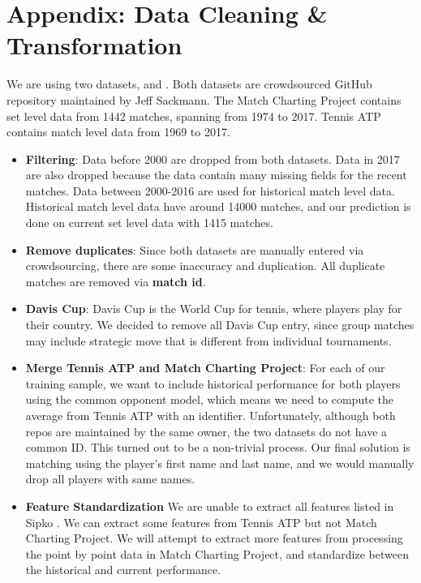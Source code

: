 \documentclass[paper=a4, fontsize=11pt]{scrartcl} %
\numberwithin{equation}{section} %
\numberwithin{figure}{section} %
\numberwithin{table}{section} %
\begin{document}
\section{Appendix: Data Cleaning \& Transformation}
We are using two datasets, \cite{tennis_atp} and \cite{tennis_charting}.  Both datasets are crowdsourced GitHub repository maintained by Jeff Sackmann.  The Match Charting Project contains set level data from 1442 matches, spanning from 1974 to 2017.  Tennis ATP contains match level data from 1969 to 2017.
\begin{itemize}
\item \textbf{Filtering}: Data before 2000 are dropped from both datasets.  Data in 2017 are also dropped because the data contain many missing fields for the recent matches.  Data between 2000-2016 are used for historical match level data.  Historical match level data have around 14000 matches, and our prediction is done on current set level data with 1415 matches.
\item \textbf{Remove duplicates}: Since both datasets are manually entered via crowdsourcing, there are some inaccuracy and duplication.  All duplicate matches are removed via \textbf{match id}.
\item \textbf{Davis Cup}: Davis Cup is the World Cup for tennis, where players play for their country.  We decided to remove all Davis Cup entry, since group matches may include strategic move that is different from individual tournaments.
\item \textbf{Merge Tennis ATP and Match Charting Project}: For each of our training sample, we want to include historical performance for both players using the common opponent model, which means we need to compute the average from Tennis ATP with an identifier.  Unfortunately, although both repos are maintained by the same owner, the two datasets do not have a common ID.  This turned out to be a non-trivial process.  Our final solution is matching using the player's first name and last name, and we would manually drop all players with same names.
\item \textbf{Feature Standardization} We are unable to extract all features listed in Sipko \cite{tennis1}.  We can extract some features from Tennis ATP but not Match Charting Project.  We will attempt to extract more features from processing the point by point data in Match Charting Project, and standardize between the historical and current performance.
\end{itemize}
\end{document}
